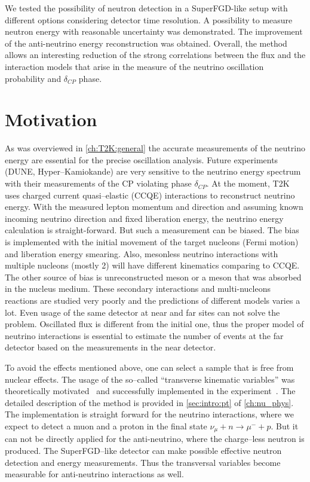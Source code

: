\documentclass[main.tex]{subfiles}
\begin{document}
We tested the possibility of neutron detection in a SuperFGD-like setup with different options considering detector time resolution. A possibility to measure neutron energy with reasonable uncertainty was demonstrated. The improvement of the anti-neutrino energy reconstruction was obtained. Overall, the method allows an interesting reduction of the strong correlations between the flux and the interaction models that arise in the measure of the neutrino oscillation probability and $\delta_{CP}$ phase.

\section{Motivation}
As was overviewed in \autoref{ch:T2K:general} the accurate measurements of the neutrino energy are essential for the precise oscillation analysis. Future experiments (DUNE, Hyper--Kamiokande) are very sensitive to the neutrino energy spectrum with their measurements of the CP violating phase $\delta_{CP}$. At the moment, T2K uses charged current quasi--elastic (CCQE) interactions to reconstruct neutrino energy. With the measured lepton momentum and direction and assuming known incoming neutrino direction and fixed liberation energy, the neutrino energy calculation is straight-forward. But such a measurement can be biased.
The bias is implemented with the initial movement of the target nucleons (Fermi motion) and liberation energy smearing. Also, mesonless neutrino interactions with multiple nucleons (mostly 2) will have different kinematics comparing to CCQE. The other source of bias is unreconstructed meson or a meson that was absorbed in the nucleus medium. These secondary interactions and multi-nucleons reactions are studied very poorly and the predictions of different models varies a lot. Even usage of the same detector at near and far sites can not solve the problem. Oscillated flux is different from the initial one, thus the proper model of neutrino interactions is essential to estimate the number of events at the far detector based on the measurements in the near detector.

To avoid the effects mentioned above, one can select a sample that is free from nuclear effects. The usage of the so--called ``transverse kinematic variables'' was theoretically motivated~\cite{Lu2016} and successfully implemented in the experiment~\cite{Abe2018d}. The detailed description of the method is provided in \autoref{sec:intro:pt} of \autoref{ch:nu_phys}. The implementation is straight forward for the neutrino interactions, where we expect to detect a muon and a proton in the final state $\nu_\mu+n\to\mu^-+p$. But it can not be directly applied for the anti-neutrino, where the charge--less neutron is produced. The SuperFGD--like detector can make possible effective neutron detection and energy measurements. Thus the transversal variables become measurable for anti-neutrino interactions as well.
\end{document}
